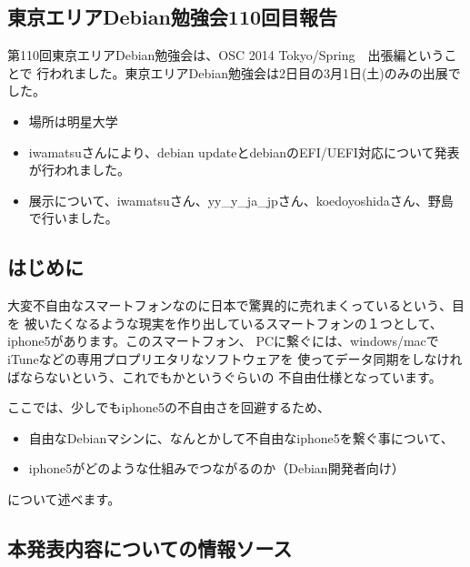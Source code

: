 \documentclass[mingoth,a4paper]{jsarticle}
\begin{document}
\subsection{東京エリアDebian勉強会110回目報告}

 第110回東京エリアDebian勉強会は、OSC 2014 Tokyo/Spring　出張編ということで
行われました。東京エリアDebian勉強会は2日目の3月1日(土)のみの出展でした。

\begin{itemize}
\item 場所は明星大学
\item iwamatsuさんにより、debian updateとdebianのEFI/UEFI対応について発表が行われました。
\item 展示について、iwamatsuさん、yy\_y\_ja\_jpさん、koedoyoshidaさん、野島で行いました。
\end{itemize}



\subsection{はじめに}

 大変不自由なスマートフォンなのに日本で驚異的に売れまくっているという、目を
被いたくなるような現実を作り出しているスマートフォンの１つとして、
iphone5があります\cite{iphone-japan-share}。このスマートフォン、
PCに繋ぐには、windows/macでiTuneなどの専用プロプリエタリなソフトウェアを
使ってデータ同期をしなければならないという、これでもかというぐらいの
不自由仕様となっています。

 ここでは、少しでもiphone5の不自由さを回避するため、

\begin{itemize}
\item 自由なDebianマシンに、なんとかして不自由なiphone5を繋ぐ事について、
\item iphone5がどのような仕組みでつながるのか（Debian開発者向け）
\end{itemize}

について述べます。

\subsection{本発表内容についての情報ソース}
\end{document}
